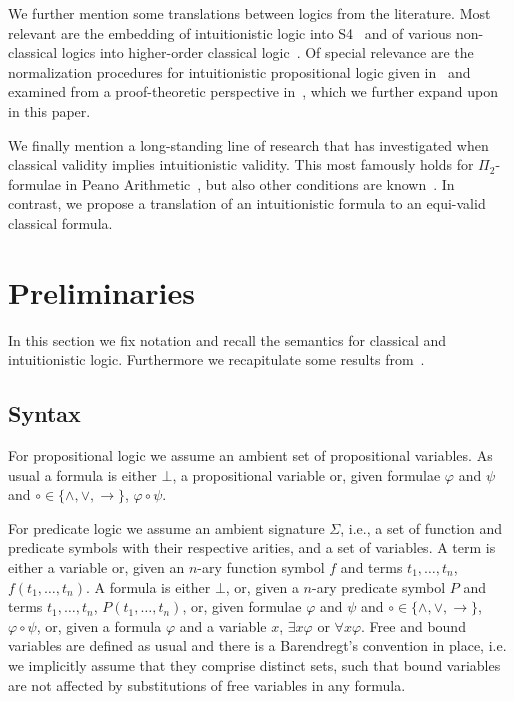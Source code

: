 \documentclass{easychair}
\theoremstyle{definition}
\theoremstyle{definition}
\theoremstyle{definition}
\theoremstyle{definition}
\theoremstyle{definition}
\theoremstyle{definition}
\theoremstyle{definition}
\begin{document}
We further mention some translations between logics from the literature.
Most relevant are the embedding of intuitionistic logic into S4~\cite{basicprooftheory} and of various non-classical logics into higher-order classical logic~\cite{LEO,wisniewski2016tptp}.
Of special relevance are the normalization procedures for intuitionistic propositional logic given in~\cite{claessen2015sat}
and examined from a proof-theoretic perspective in~\cite{fiorentini2019proof}, which we further expand upon in this paper.

We finally mention a long-standing line of research that has investigated when classical validity implies intuitionistic validity.
This most famously holds for $\Pi_2$-formulae in Peano Arithmetic~\cite{friedman1978classically}, but also other conditions are known~\cite{schwichtenberg}.
In contrast, we propose a translation of an intuitionistic formula to an equi-valid classical formula.


\section{Preliminaries}

In this section we fix notation and recall the semantics for classical and intuitionistic logic. Furthermore we recapitulate some results from~\cite{otten2005clausal}.

\subsection{Syntax}

For propositional logic we assume an ambient set of propositional variables. As usual a formula is either $\bot$, a propositional variable or, given formulae $\varphi$ and $\psi$ and $\circ\in\{\wedge, \vee,\to\}$, $\varphi\circ\psi$.

For predicate logic we assume an ambient signature $\Sigma$, i.e., a set of function and predicate symbols with their respective arities, and a set of variables. A term is either a variable or, given an $n$-ary function symbol $f$ and terms $t_1, \ldots, t_n$, $f(t_1, \ldots, t_n)$. A formula is either $\bot$, or, given a $n$-ary predicate symbol $P$ and terms $t_1, \ldots, t_n$, $P(t_1, \ldots, t_n)$, or, given formulae $\varphi$ and $\psi$ and $\circ\in\{\wedge, \vee,\to\}$, $\varphi\circ\psi$, or, given a formula $\varphi$ and a variable $x$, $\exists x\varphi$ or $\forall x\varphi$. Free and bound variables are defined as usual and there is a Barendregt's convention in place, i.e. we implicitly assume that they comprise distinct sets, such that bound variables are not affected by substitutions of free variables in any formula.
\end{document}
